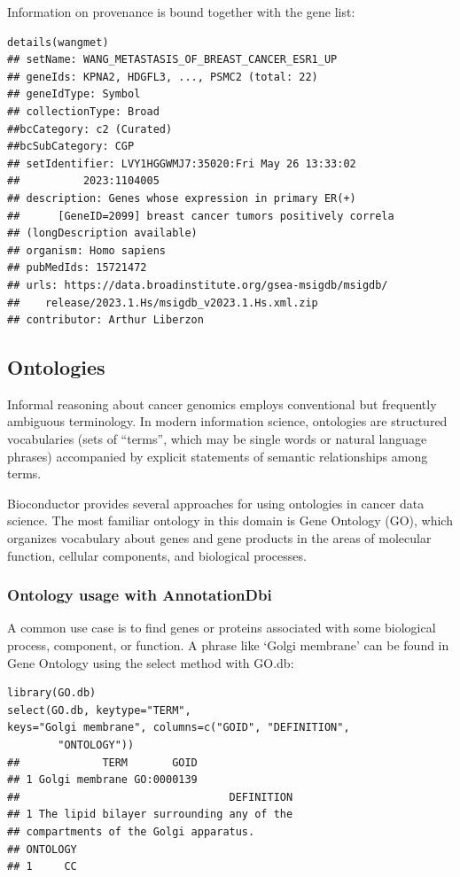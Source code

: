 \documentclass[graybox]{svmult}
\begin{document}
Information on provenance is bound together with the gene list:

\begin{shaded}
\begin{verbatim}
details(wangmet)
## setName: WANG_METASTASIS_OF_BREAST_CANCER_ESR1_UP
## geneIds: KPNA2, HDGFL3, ..., PSMC2 (total: 22)
## geneIdType: Symbol
## collectionType: Broad
##bcCategory: c2 (Curated)
##bcSubCategory: CGP
## setIdentifier: LVY1HGGWMJ7:35020:Fri May 26 13:33:02 
##          2023:1104005
## description: Genes whose expression in primary ER(+) 
##      [GeneID=2099] breast cancer tumors positively correla
## (longDescription available)
## organism: Homo sapiens
## pubMedIds: 15721472
## urls: https://data.broadinstitute.org/gsea-msigdb/msigdb/
##    release/2023.1.Hs/msigdb_v2023.1.Hs.xml.zip
## contributor: Arthur Liberzon
\end{verbatim}
\end{shaded}

\subsection{Ontologies}\label{ontologies}

Informal reasoning about cancer genomics employs conventional
but frequently ambiguous terminology. In modern
information science, ontologies are structured vocabularies
(sets of ``terms'', which may be single words or natural language
phrases) accompanied by
explicit statements of semantic relationships among terms.

Bioconductor provides several approaches for using ontologies
in cancer data science. The most familiar ontology
in this domain is Gene Ontology (GO), which organizes vocabulary
about genes and gene products in
the areas of molecular function, cellular components, and
biological processes.

\subsubsection{Ontology usage with AnnotationDbi}\label{ontology-usage-with-annotationdbi}

A common use case is to find genes or proteins associated
with some biological process, component, or function.
A phrase like `Golgi membrane' can be found in Gene Ontology
using the select method with GO.db:

\begin{shaded}
\begin{verbatim}
library(GO.db)
select(GO.db, keytype="TERM",
keys="Golgi membrane", columns=c("GOID", "DEFINITION", 
        "ONTOLOGY"))
##             TERM       GOID
## 1 Golgi membrane GO:0000139
##                                 DEFINITION
## 1 The lipid bilayer surrounding any of the 
## compartments of the Golgi apparatus.
## ONTOLOGY
## 1     CC
\end{verbatim}
\end{shaded}
\end{document}
